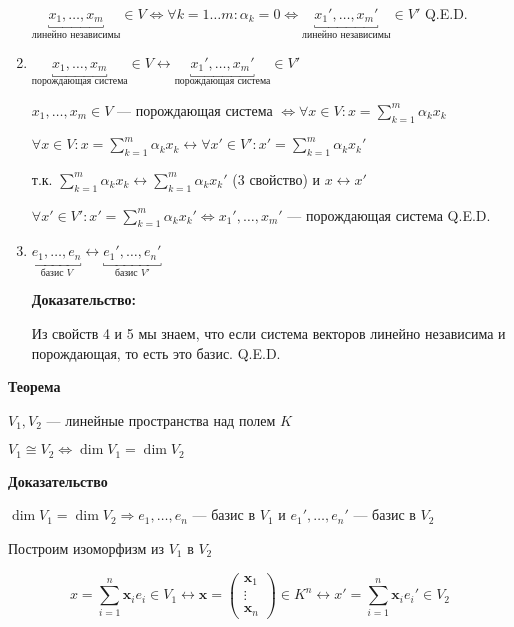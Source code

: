 \begin{enumerate}
          \(\underbracket{x_1, \ldots
              , x_m}_{\text{линейно независимы}} \in V \Leftrightarrow \forall k = 1 \ldots m: \alpha_k = 0 \Leftrightarrow \underbracket{x_1', \ldots
              , x_m'}_{\text{линейно независимы}} \in V'\)
          \hfill Q.E.D.

    \item \(\underbracket{x_1, \ldots
              , x_m}_{\text{порождающая система}} \in V \longleftrightarrow \underbracket{x_1', \ldots, x_m'}_{\text{порождающая система}} \in V'\)

          \(x_1, \ldots, x_m \in V\) --- порождающая система \(\Leftrightarrow \forall x \in V: x = \sum\limits_{k = 1}^{m} \alpha_k x_k\)

          \(\forall x \in V: x = \sum\limits_{k = 1}^{m} \alpha_k x_k \longleftrightarrow \forall x' \in V': x' = \sum\limits_{k = 1}^{m} \alpha_k x_k'\)

          т.к. \(\sum\limits_{k = 1}^{m} \alpha_k x_k \longleftrightarrow \sum\limits_{k = 1}^{m} \alpha_k x_k'\) (3 свойство) и \(x \longleftrightarrow x'\)

          \(\forall x' \in V': x' = \sum\limits_{k = 1}^{m} \alpha_k x_k' \Leftrightarrow x_1', \ldots, x_m'\) --- порождающая система
          \hfill Q.E.D.

    \item \(\underbracket{e_1, \ldots, e_n}_{\text{базис } V} \longleftrightarrow \underbracket{e_1', \ldots, e_n'}_{\text{базис } V'}\)

          \textbf{Доказательство:}

          Из свойств 4 и 5 мы знаем, что если система векторов линейно независима и порождающая, то есть это базис.
          \hfill Q.E.D.
\end{enumerate}

\textbf{Теорема}

\(V_1, V_2\) --- линейные пространства над полем \(K\)

\(V_1 \cong V_2 \Leftrightarrow \dim V_1 = \dim V_2\)

\textbf{Доказательство}

\fbox{\(\Leftarrow\)}
\(\dim V_1 = \dim V_2 \Rightarrow e_1, \ldots, e_n\) --- базис в \(V_1\) и \(e_1', \ldots, e_n'\) --- базис в \(V_2\)

Построим изоморфизм из \(V_1\) в \(V_2\)


\[
    x = \sum\limits_{i = 1}^{n} \mathbf{x}_i e_i \in V_1 \longleftrightarrow \mathbf{x} = \begin{pmatrix}
        \mathbf{x}_{1}  \\
        \vdots \\
        \mathbf{x}_{n}
    \end{pmatrix} \in K^n \longleftrightarrow x' = \sum\limits_{i = 1}^{n} \mathbf{x}_i e_i' \in V_2
\]

